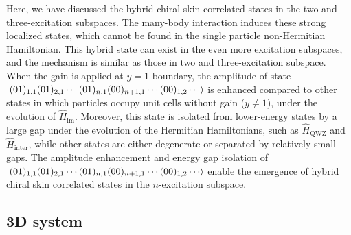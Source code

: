 \documentclass[longbibliography, aps, prx, amsmath, amssymb, amsfonts, twocolumn,superscriptaddress, footinbib]{revtex4-1}
\begin{document}
	Here, we have discussed the hybrid chiral skin correlated states in the two and three-excitation subspaces. The many-body interaction induces these strong localized states, which cannot be found in the single particle non-Hermitian Hamiltonian. This hybrid state can exist in the even more excitation subspaces, and the mechanism is similar as those in two and three-excitation subspace. 
	When the gain is applied at $y=1$ boundary, the amplitude of state $\ket{(01)_{1,1}(01)_{2,1}\cdots(01)_{n,1}(00)_{n+1,1}\cdots(00)_{1,2}\cdots}$ is enhanced compared to other states in which particles occupy unit cells without gain ($y\neq 1$), under the evolution of $\hat{H}_{\text{im}}$. Moreover, this state is isolated from lower-energy states by a large gap under the evolution of the Hermitian Hamiltonians, such as $\hat{H}_{\text{QWZ}}$ and $\hat{H}_{\text{inter}}$, while other states are either degenerate or separated by relatively small gaps. The amplitude enhancement and energy gap isolation of $\ket{(01)_{1,1}(01)_{2,1}\cdots(01)_{n,1}(00)_{n+1,1}\cdots(00)_{1,2}\cdots}$ enable the emergence of hybrid chiral skin correlated states in the $n$-excitation subspace. 


	\subsection{3D system~\label{sec:appendC_3D}}
\end{document}

